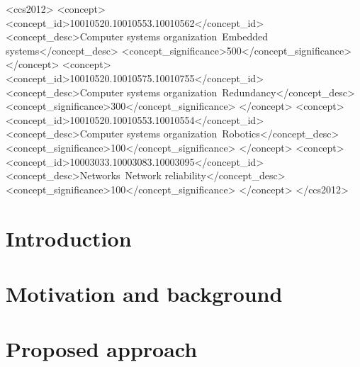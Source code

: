 \documentclass[sigconf,review, anonymous,screen]{acmart}
\begin{document}
\begin{CCSXML}
<ccs2012>
 <concept>
  <concept_id>10010520.10010553.10010562</concept_id>
  <concept_desc>Computer systems organization~Embedded systems</concept_desc>
  <concept_significance>500</concept_significance>
 </concept>
 <concept>
  <concept_id>10010520.10010575.10010755</concept_id>
  <concept_desc>Computer systems organization~Redundancy</concept_desc>
  <concept_significance>300</concept_significance>
 </concept>
 <concept>
  <concept_id>10010520.10010553.10010554</concept_id>
  <concept_desc>Computer systems organization~Robotics</concept_desc>
  <concept_significance>100</concept_significance>
 </concept>
 <concept>
  <concept_id>10003033.10003083.10003095</concept_id>
  <concept_desc>Networks~Network reliability</concept_desc>
  <concept_significance>100</concept_significance>
 </concept>
</ccs2012>
\end{CCSXML}



\maketitle
	\section{Introduction}
\label{sec:Introduction}



\section{Motivation and background}
\label{sec:Background}







\section{Proposed approach}
\label{sec:ProposedApproach}

\end{document}
